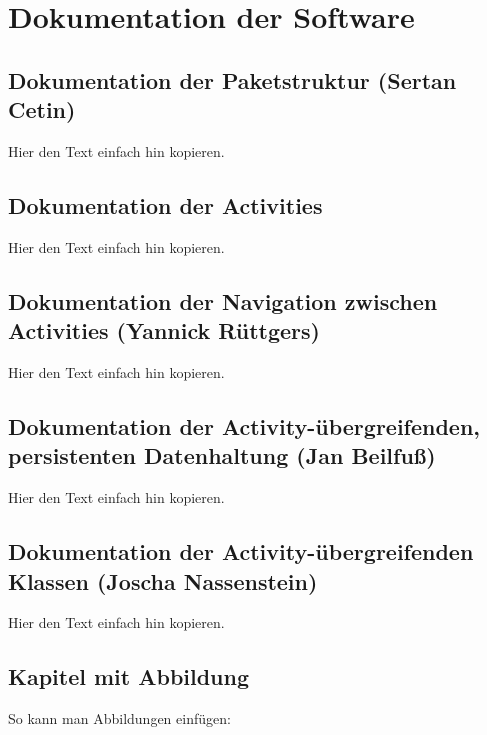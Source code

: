 \section{Dokumentation der Software}
\label{instal}

\subsection{Dokumentation der Paketstruktur (Sertan Cetin)}

Hier den Text einfach hin kopieren.

\subsection{Dokumentation der Activities}

Hier den Text einfach hin kopieren.

\subsection{Dokumentation der Navigation zwischen Activities (Yannick Rüttgers)}

Hier den Text einfach hin kopieren.

\subsection{Dokumentation der Activity-übergreifenden, persistenten Datenhaltung (Jan Beilfuß)}

Hier den Text einfach hin kopieren.

\subsection{Dokumentation der Activity-übergreifenden Klassen (Joscha Nassenstein)}

Hier den Text einfach hin kopieren.


\subsection{Kapitel mit Abbildung}

So kann man Abbildungen einfügen:

